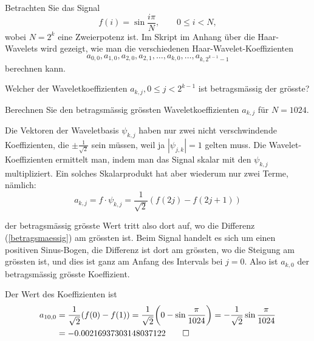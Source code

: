 Betrachten Sie das Signal
\[
f(i)=\sin\frac{i\pi}{N}, \qquad 0\le i<N,
\]
wobei $N=2^k$ eine Zweierpotenz ist.
Im Skript im Anhang über die Haar-Wavelets wird gezeigt,
wie man die verschiedenen Haar-Wavelet-Koeffizienten
$$a_{0,0},a_{1,0}, a_{2,0},a_{2,1},\dots ,a_{k,0},\dots, a_{k,2^{k-1}-1}$$
berechnen kann.
\begin{teilaufgaben}
\item
Welcher der Waveletkoeffizienten $a_{k,j}, 0\le j<2^{k-1}$ ist betragsmässig
der grösste?
\item
Berechnen Sie den betragsmässig grössten Waveletkoeffizienten $a_{k,j}$
für $N=1024$.
\end{teilaufgaben}

\begin{loesung}
Die Vektoren der Waveletbasis $\psi_{k,j}$ haben nur zwei nicht verschwindende
Koeffizienten, die $\pm\frac1{\sqrt{2}}$ sein müssen, weil ja $|\psi_{j,k}|=1$
gelten muss. Die Wavelet-Koeffizienten ermittelt man, indem man das Signal
skalar mit den $\psi_{k,j}$ multipliziert. Ein solches Skalarprodukt hat
aber wiederum nur zwei Terme, nämlich:
\begin{equation}
a_{k,j}=f\cdot \psi_{k,j} = \frac1{\sqrt{2}}(f(2j)-f(2j+1))
\label{betragsmaessig}
\end{equation}
\begin{teilaufgaben}
\item der betragsmässig grösste Wert tritt also dort auf, wo die Differenz
(\ref{betragsmaessig}) am grössten ist. Beim Signal handelt es sich um
einen positiven Sinus-Bogen, die Differenz ist dort am grössten, wo die
Steigung am grössten ist, und dies ist ganz am Anfang des Intervals bei
$j=0$. Also ist $a_{k,0}$ der betragsmässig grösste Koeffizient.
\item Der Wert des Koeffizienten ist
\begin{align*}
a_{10,0}&=\frac1{\sqrt{2}}(f(0)-f(1))=\frac1{\sqrt{2}}\biggl(0-\sin\frac{\pi}{1024}\biggr)
=-\frac1{\sqrt{2}}\sin\frac{\pi}{1024}\\
&=-0.00216937303148037122
\qedhere
\end{align*}
\end{teilaufgaben}
\end{loesung}

